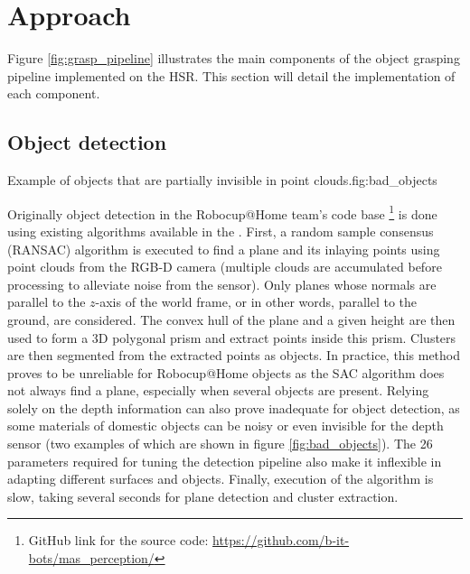 \pagebreak
\section{Approach}


Figure \ref{fig:grasp_pipeline} illustrates the main components of the object grasping pipeline implemented on the HSR.
This section will detail the implementation of each component.

\subsection{Object detection}
             {Example of objects that are partially invisible in point clouds.}{fig:bad_objects}{\textwidth}

Originally object detection in the Robocup@Home team's code base \footnote{GitHub link for the source code:
\url{https://github.com/b-it-bots/mas\_perception/}} is done using existing algorithms available in the
. First, a random sample consensus (RANSAC)
algorithm is executed to find a plane and its inlaying points using point clouds from the RGB-D camera (multiple clouds
are accumulated before processing to alleviate noise from the sensor). Only planes whose normals are parallel to the
$ z $-axis of the world frame, or in other words, parallel to the ground, are considered. The convex hull of the plane
and a given height are then used to form a 3D polygonal prism and extract points inside this prism. Clusters are then
segmented from the extracted points as objects. In practice, this method proves to be unreliable for Robocup@Home
objects as the SAC algorithm does not always find a plane, especially when several objects are present. Relying solely
on the depth information can also prove inadequate for object detection, as some materials of domestic objects can be
noisy or even invisible for the depth sensor (two examples of which are shown in figure \ref{fig:bad_objects}). The 26
parameters required for tuning the detection pipeline also make it inflexible in adapting different surfaces and
objects. Finally, execution of the algorithm is slow, taking several seconds for plane detection and cluster extraction.

